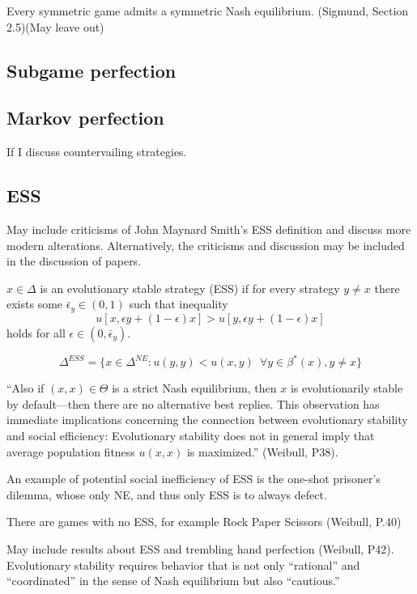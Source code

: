 \begin{theorem}
Every symmetric game admits a symmetric Nash equilibrium. (Sigmund, Section 2.5)(May leave out)
\end{theorem}
\subsection{Subgame perfection}

\subsection{Markov perfection}
If I discuss countervailing strategies. 
 
\subsection{ESS}
May include criticisms of John Maynard Smith's ESS definition and discuss more modern alterations. Alternatively, the criticisms and discussion may be included in the discussion of papers.
\begin{definition}$x \in \Delta$ is an evolutionary stable strategy (ESS) if for every strategy $y \neq x$ there exists some $\bar{\epsilon}_y \in (0, 1)$ such that inequality
\[
u[x, \epsilon y + (1-\epsilon) x ] > u [ y, \epsilon y + (1- \epsilon) x]
\]
holds for all $\epsilon \in (0, \bar{\epsilon}_y)$.
\end{definition}
\begin{proposition}
\[
\Delta^{ESS} = \{ x \in \Delta^{NE} : u(y, y) < u(x, y) \enspace \forall y \in \beta^* (x), y \neq x \}
\]
\end{proposition}


``Also if $(x, x) \in \Theta$ is a strict Nash equilibrium, then $x$ is evolutionarily stable by default---then there are no alternative best replies. This observation has immediate implications concerning the connection between evolutionary stability and social efficiency: Evolutionary stability does not in general imply that average population fitness $u(x, x)$ is maximized.'' (Weibull, P38).

An example of potential social inefficiency of ESS is the one-shot prisoner's dilemma, whose only NE, and thus only ESS is to always defect.

There are games with no ESS, for example Rock Paper Scissors (Weibull, P.40)

May include results about ESS and trembling hand perfection (Weibull, P42). Evolutionary stability requires behavior that is not only ``rational'' and ``coordinated'' in the sense of Nash equilibrium but also ``cautious.''

